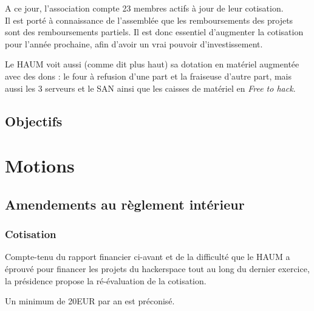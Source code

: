 \documentclass[a4paper, 11pt]{article}
\begin{document}
A ce jour, l'association compte 23 membres actifs à jour de leur cotisation. \\

Il est porté à connaissance de l'assemblée que les remboursements des projets sont des remboursements partiels. Il est donc essentiel d'augmenter la cotisation pour l'année prochaine, afin d'avoir un vrai pouvoir d'investissement.

Le HAUM voit aussi (comme dit plus haut) sa dotation en matériel augmentée avec des dons : le four à refusion d'une part
et la fraiseuse d'autre part, mais aussi les 3 serveurs et le SAN ainsi que les caisses de matériel en \textit{Free to
hack}.

\subsection{Objectifs}


\section{Motions}

\subsection{Amendements au règlement intérieur}

\subsubsection{Cotisation}

Compte-tenu du rapport financier ci-avant et de la difficulté que le HAUM a éprouvé pour financer les projets du hackerspace tout au long du dernier exercice, la présidence propose la ré-évaluation de la cotisation.

Un minimum de 20EUR par an est préconisé.
\end{document}
